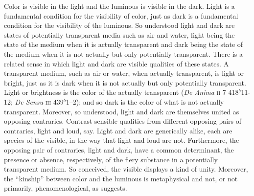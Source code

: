 Color is visible in the light and the luminous is visible in the dark. Light is a fundamental condition for the visibility of color, just as dark is a fundamental condition for the visibility of the luminous. So understood light and dark are states of potentially transparent media such as air and water, light being the state of the medium when it is actually transparent and dark being the state of the medium when it is not actually but only potentially transparent. There is a related sense in which light and dark are visible qualities of these states. A transparent medium, such as air or water, when actually transparent, is light or bright, just as it is dark when it is not actually but only potentially transparent. Light or brightness is the color of the actually transparent (\emph{De Anima} \textsc{ii} 7 418\( ^{b} \)11-12; \emph{De Sensu} \textsc{iii} 439\( ^{b} \)1--2); and so dark is the color of what is not actually transparent. Moreover, so understood, light and dark are themselves united as opposing contraries. Contrast sensible qualities from different opposing pairs of contraries, light and loud, say. Light and dark are generically alike, each are species of the visible, in the way that light and loud are not. Furthermore, the opposing pair of contraries, light and dark, have a common determinant, the presence or absence, respectively, of the fiery substance in a potentially transparent medium. So conceived, the visible displays a kind of unity. Moreover, the ``kinship'' between color and the luminous is metaphysical and not, or not primarily, phenomenological, as \citet[63]{Sorabji:1971fr} suggests.

